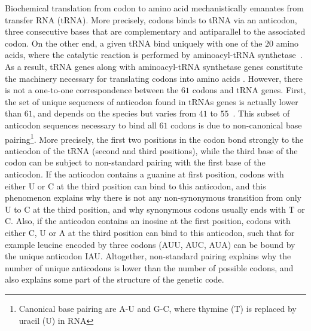Biochemical translation from codon to amino acid mechanistically emanates from transfer \acrshort{RNA} (\acrshort{tRNA}).
More precisely, codons binds to \acrshort{tRNA} via an anticodon, three consecutive bases that are complementary and antiparallel to the associated codon.
On the other end, a given \acrshort{tRNA} bind uniquely with one of the $20$ amino acids, where the catalytic reaction is performed by aminoacyl-tRNA synthetase~\citep{Rich1976}.
As a result, \acrshort{tRNA} genes along with aminoacyl-tRNA synthetase genes constitute the machinery necessary for translating codons into amino acids .
However, there is not a one-to-one correspondence between the $61$ codons and \acrshort{tRNA} genes.
First, the set of unique sequences of anticodon found in tRNAs genes is actually lower than $61$, and depends on the species but varies from $41$ to $55$~\citep{Goodenbour2006}.
This subset of anticodon sequences necessary to bind all $61$ codons is due to non-canonical base pairing\footnote{Canonical base pairing are A-U and G-C, where thymine (T) is replaced by uracil (U) in RNA}.
More precisely, the first two positions in the codon bond strongly to the anticodon of the \acrshort{tRNA} (second and third positions), while the third base of the codon can be subject to non-standard pairing with the first base of the anticodon.
If the anticodon contains a guanine at first position, codons with either U or C at the third position can bind to this anticodon, and this phenomenon explains why there is not any non-synonymous transition from only U to C at the third position, and why synonymous codons usually ends with T or C.
Also, if the anticodon contains an inosine at the first position, codons with either C, U or A at the third position can bind to this anticodon, such that for example leucine encoded by three codons (AUU, AUC, AUA) can be bound by the unique anticodon IAU.
Altogether, non-standard pairing explains why the number of unique anticodons is lower than the number of possible codons, and also explains some part of the structure of the genetic code.

